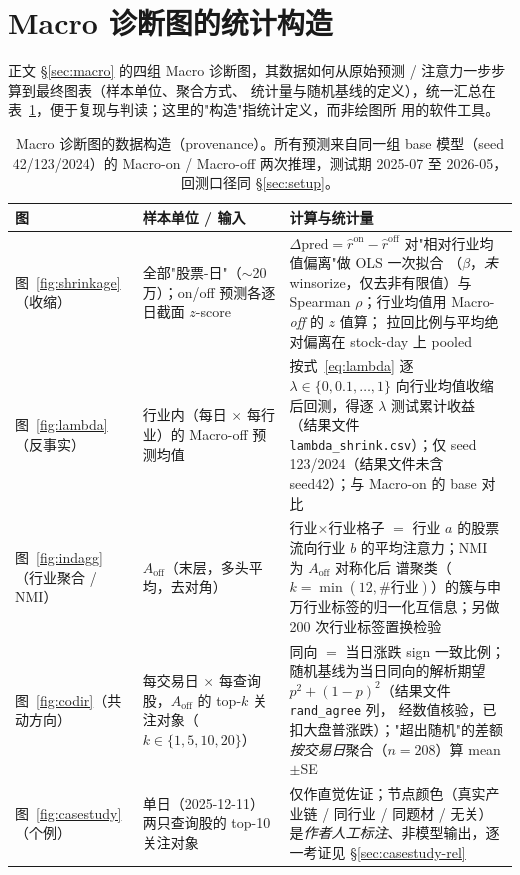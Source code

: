 \documentclass[a4paper,11pt,fontset=fandol]{ctexart}
\begin{document}
\section{Macro 诊断图的统计构造}\label{sec:macro-prov}
正文 §\ref{sec:macro} 的四组 Macro 诊断图，其数据如何从原始预测 / 注意力一步步算到最终图表（样本单位、聚合方式、
统计量与随机基线的定义），统一汇总在表~\ref{tab:macro-prov}，便于复现与判读；这里的"构造"指统计定义，而非绘图所
用的软件工具。

\begin{table}[H]
\centering
\caption{Macro 诊断图的数据构造（provenance）。所有预测来自同一组 base 模型（seed 42/123/2024）的
Macro-on / Macro-off 两次推理，测试期 2025-07 至 2026-05，回测口径同 §\ref{sec:setup}。}
\label{tab:macro-prov}
\begin{tabularx}{\linewidth}{l>{\raggedright\arraybackslash}X>{\raggedright\arraybackslash}X}
\toprule
图 & 样本单位 / 输入 & 计算与统计量 \\
\midrule
图~\ref{fig:shrinkage}（收缩） & 全部"股票-日"（$\sim$20 万）；on/off 预测各逐日截面 $z$-score &
$\Delta\text{pred}{=}\hat r^{\mathrm{on}}{-}\hat r^{\mathrm{off}}$ 对"相对行业均值偏离"做 OLS 一次拟合
（$\beta$，\emph{未} winsorize，仅去非有限值）与 Spearman $\rho$；行业均值用 Macro-\emph{off} 的 $z$ 值算；
拉回比例与平均绝对偏离在 stock-day 上 pooled \\
图~\ref{fig:lambda}（反事实） & 行业内（每日 $\times$ 每行业）的 Macro-off 预测均值 &
按式~\eqref{eq:lambda} 逐 $\lambda\in\{0,0.1,\dots,1\}$ 向行业均值收缩后回测，得逐 $\lambda$ 测试累计收益
（结果文件 \texttt{lambda\_shrink.csv}）；仅 seed 123/2024（结果文件未含 seed42）；与 Macro-on 的 base 对比 \\
图~\ref{fig:indagg}（行业聚合 / NMI） & $A_{\mathrm{off}}$（末层，多头平均，去对角） &
行业$\times$行业格子 $=$ 行业 $a$ 的股票流向行业 $b$ 的平均注意力；NMI 为 $A_{\mathrm{off}}$ 对称化后
谱聚类（$k{=}\min(12,\#\text{行业})$）的簇与申万行业标签的归一化互信息；另做 200 次行业标签置换检验 \\
图~\ref{fig:codir}（共动方向） & 每交易日 $\times$ 每查询股，$A_{\mathrm{off}}$ 的 top-$k$ 关注对象（$k{\in}\{1,5,10,20\}$） &
同向 $=$ 当日涨跌 sign 一致比例；随机基线为当日同向的解析期望 $p^2{+}(1{-}p)^2$（结果文件 \texttt{rand\_agree} 列，
经数值核验，已扣大盘普涨跌）；"超出随机"的差额\emph{按交易日}聚合（$n{=}208$）算 mean$\pm$SE \\
图~\ref{fig:casestudy}（个例） & 单日（2025-12-11）两只查询股的 top-10 关注对象 &
仅作直觉佐证；节点颜色（真实产业链 / 同行业 / 同题材 / 无关）是\emph{作者人工标注}、非模型输出，逐一考证见
§\ref{sec:casestudy-rel} \\
\bottomrule
\end{tabularx}
\end{table}
\end{document}
